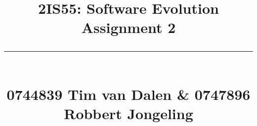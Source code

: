 \title{
	\huge\raggedright 2IS55: Software Evolution \hfill{\Large Assignment 2}\\ \vspace{-0.9\baselineskip}\rule{\linewidth}{1pt}\\
	\small\hfill 0744839 Tim van Dalen \& 0747896 Robbert Jongeling
	\normalsize
}

